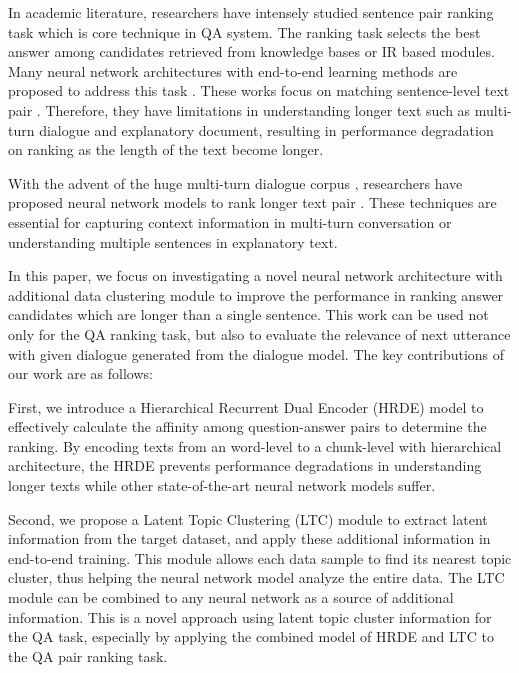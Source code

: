 \documentclass[11pt,a4paper]{article}
\begin{document}
In academic literature, researchers have intensely studied sentence pair ranking task which is core technique in QA system. The ranking task selects the best answer among candidates retrieved from knowledge bases or IR based modules. 
Many neural network architectures with end-to-end learning methods are proposed to address this task \cite{yin2016abcnn, wang2016compare,wang2017bilateral}.
These works focus on matching sentence-level text pair \cite{wang2007jeopardy,yang2015wikiqa,bowman2015large}. Therefore, they have limitations in understanding longer text such as multi-turn dialogue and explanatory document, resulting in performance degradation on ranking as the length of the text become longer.

With the advent of the huge multi-turn dialogue corpus \cite{lowe2015ubuntu}, researchers have proposed neural network models to rank longer text pair \cite{kadlec2015improved,baudivs2016sentence}.
These techniques are essential for capturing context information in multi-turn conversation or understanding multiple sentences in explanatory text.




In this paper, we focus on investigating a novel neural network architecture with additional data clustering module to improve the performance in ranking answer candidates which are longer than a single sentence.
This work can be used not only for the QA ranking task, but also to evaluate the relevance of next utterance with given dialogue generated from the dialogue model. 
The key contributions of our work are as follows:

First, we introduce a Hierarchical Recurrent Dual Encoder (HRDE) model to effectively calculate the affinity among question-answer pairs to determine the ranking.
By encoding texts from an word-level to a chunk-level with hierarchical architecture, the HRDE prevents performance degradations in understanding longer texts while other state-of-the-art neural network models suffer.

Second, we propose a Latent Topic Clustering (LTC) module to extract latent information from the target dataset, and apply these additional information in end-to-end training.
This module allows each data sample to find its nearest topic cluster, thus helping the neural network model analyze the entire data. 
The LTC module can be combined to any neural network as a source of additional information. 
This is a novel approach using latent topic cluster information for the QA task, especially by applying the combined model of HRDE and LTC to the QA pair ranking task. 
\end{document}

